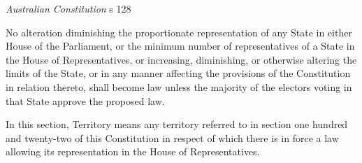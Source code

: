\begin{statutedetails}{\textit{Australian Constitution} s 128}
    \vspace{\baselineskip}

    No alteration diminishing the proportionate representation of any State in either House of the Parliament, or the minimum number of representatives of a State in the House of Representatives, or increasing, diminishing, or otherwise altering the limits of the State, or in any manner affecting the provisions of the Constitution in relation thereto, shall become law unless the majority of the electors voting in that State approve the proposed law.

    \vspace{\baselineskip}

    In this section, Territory means any territory referred to in section one hundred and twenty-two of this Constitution in respect of which there is in force a law allowing its representation in the House of Representatives.
\end{statutedetails}